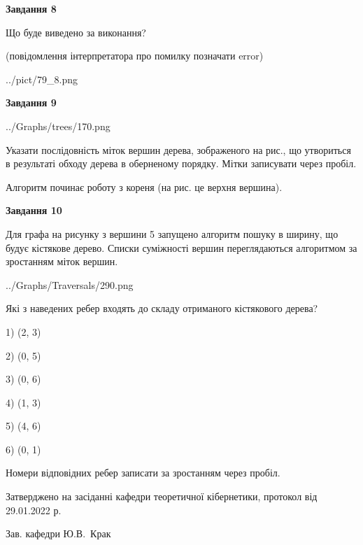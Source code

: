 \documentclass[12pt, ukrainian]{article}
\begin{document}
{\begin {large}
{\begin {center}\textbf{Завдання 8}\end {center}}\par
Що буде виведено за виконання?\par
 (повідомлення інтерпретатора про помилку позначати error)\par
\begin{center}
	{../pict/79_8.png}
\end{center}
\newpage

{\begin {center}\textbf{Завдання 9}\end {center}}\par

\begin{center}
	{../Graphs/trees/170.png}
\end{center}
Указати послідовність міток вершин дерева, зображеного на рис., що утвориться в результаті обходу дерева в оберненому порядку. Мітки записувати через пробіл.\par Алгоритм починає роботу з кореня (на рис. це верхня вершина).\par
\newpage

{\begin {center}\textbf{Завдання 10}\end {center}}\par
Для графа на рисунку з вершини 5 запущено алгоритм пошуку в ширину, що будує кістякове дерево. Списки суміжності вершин переглядаються алгоритмом за зростанням міток вершин.\par
\begin{center}
	{../Graphs/Traversals/290.png}
\end{center}
\par Які з наведених ребер входять до складу отриманого кістякового дерева?\par
1) (2, 3)\par
2) (0, 5)\par
3) (0, 6)\par
4) (1, 3)\par
5) (4, 6)\par
6) (0, 1)\par
{\vskip 15pt} Номери відповідних ребер записати за зростанням через пробіл.\par
\newpage


\end {large}
}
{\smallskip \begin {small} Затверджено на засіданні кафедри теоретичної кібернетики, протокол  від   29.01.2022 р.\par\smallskip\smallskip
{\parbox {6.5 cm}{Зав. кафедри \dotfill Ю.В.~Крак}} \end{small}}
\end{document}
